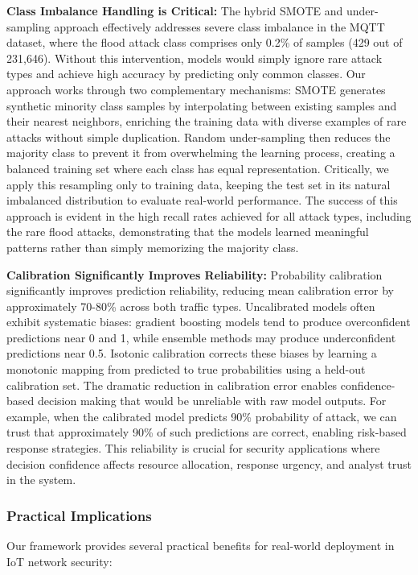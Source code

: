 \documentclass[conference]{IEEEtran}
\begin{document}
\textbf{Class Imbalance Handling is Critical:} The hybrid SMOTE and under-sampling approach effectively addresses severe class imbalance in the MQTT dataset, where the flood attack class comprises only 0.2\% of samples (429 out of 231,646). Without this intervention, models would simply ignore rare attack types and achieve high accuracy by predicting only common classes. Our approach works through two complementary mechanisms: SMOTE generates synthetic minority class samples by interpolating between existing samples and their nearest neighbors, enriching the training data with diverse examples of rare attacks without simple duplication. Random under-sampling then reduces the majority class to prevent it from overwhelming the learning process, creating a balanced training set where each class has equal representation. Critically, we apply this resampling only to training data, keeping the test set in its natural imbalanced distribution to evaluate real-world performance. The success of this approach is evident in the high recall rates achieved for all attack types, including the rare flood attacks, demonstrating that the models learned meaningful patterns rather than simply memorizing the majority class.

\textbf{Calibration Significantly Improves Reliability:} Probability calibration significantly improves prediction reliability, reducing mean calibration error by approximately 70-80\% across both traffic types. Uncalibrated models often exhibit systematic biases: gradient boosting models tend to produce overconfident predictions near 0 and 1, while ensemble methods may produce underconfident predictions near 0.5. Isotonic calibration corrects these biases by learning a monotonic mapping from predicted to true probabilities using a held-out calibration set. The dramatic reduction in calibration error enables confidence-based decision making that would be unreliable with raw model outputs. For example, when the calibrated model predicts 90\% probability of attack, we can trust that approximately 90\% of such predictions are correct, enabling risk-based response strategies. This reliability is crucial for security applications where decision confidence affects resource allocation, response urgency, and analyst trust in the system.

\subsubsection{Practical Implications}

Our framework provides several practical benefits for real-world deployment in IoT network security:
\end{document}
